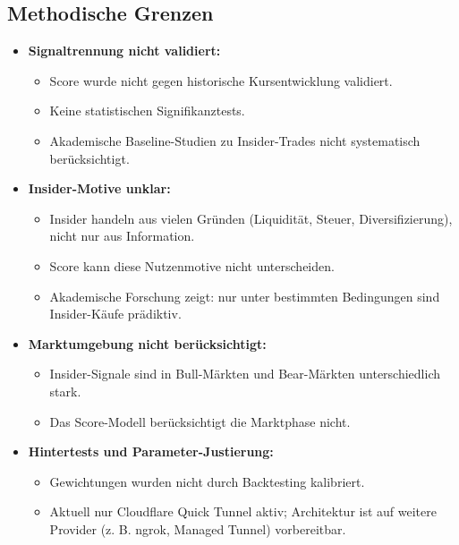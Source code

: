 \subsection{Methodische Grenzen}
\begin{itemize}
  \item \textbf{Signaltrennung nicht validiert:} %
    \begin{itemize}
      \item Score wurde nicht gegen historische Kursentwicklung validiert.
      \item Keine statistischen Signifikanztests.
      \item Akademische Baseline-Studien zu Insider-Trades nicht systematisch berücksichtigt. %
    \end{itemize}
  \item \textbf{Insider-Motive unklar:} %
    \begin{itemize}
      \item Insider handeln aus vielen Gründen (Liquidität, Steuer, Diversifizierung), nicht nur aus Information.
      \item Score kann diese Nutzenmotive nicht unterscheiden.
      \item Akademische Forschung zeigt: nur unter bestimmten Bedingungen sind Insider-Käufe prädiktiv. %
    \end{itemize}
  \item \textbf{Marktumgebung nicht berücksichtigt:} %
    \begin{itemize}
      \item Insider-Signale sind in Bull-Märkten und Bear-Märkten unterschiedlich stark.
      \item Das Score-Modell berücksichtigt die Marktphase nicht.
    \end{itemize}
  \item \textbf{Hintertests und Parameter-Justierung:} %
    \begin{itemize}
      \item Gewichtungen wurden nicht durch Backtesting kalibriert.
      \item Aktuell nur Cloudflare Quick Tunnel aktiv; Architektur ist auf weitere Provider (z. B. ngrok, Managed Tunnel) vorbereitbar.
    \end{itemize}
\end{itemize}


